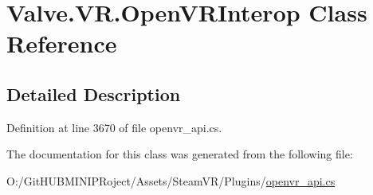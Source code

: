 \hypertarget{class_valve_1_1_v_r_1_1_open_v_r_interop}{}\section{Valve.\+V\+R.\+Open\+V\+R\+Interop Class Reference}
\label{class_valve_1_1_v_r_1_1_open_v_r_interop}


\subsection{Detailed Description}


Definition at line 3670 of file openvr\+\_\+api.\+cs.



The documentation for this class was generated from the following file\+:\begin{DoxyCompactItemize}
\item 
O\+:/\+Git\+H\+U\+B\+M\+I\+N\+I\+P\+Roject/\+Assets/\+Steam\+V\+R/\+Plugins/\mbox{\hyperlink{openvr__api_8cs}{openvr\+\_\+api.\+cs}}\end{DoxyCompactItemize}
